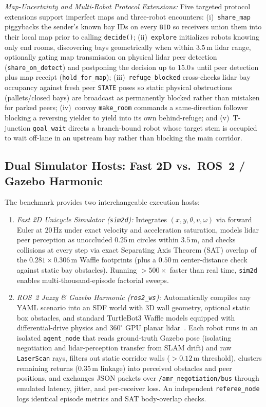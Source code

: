 \documentclass[letterpaper,journal]{IEEEtran}
\begin{document}
\smallskip\noindent\emph{Map-Uncertainty and Multi-Robot Protocol Extensions:} Five targeted protocol extensions support imperfect maps and three-robot encounters: (i)~\texttt{share\_map} piggybacks the sender's known bay IDs on every \texttt{BID} so receivers union them into their local map prior to calling \texttt{decide()}; (ii)~\texttt{explore} initializes robots knowing only end rooms, discovering bays geometrically when within $3.5$\,m lidar range, optionally gating map transmission on physical lidar peer detection (\texttt{share\_on\_detect}) and postponing the decision up to $15.0$\,s until peer detection plus map receipt (\texttt{hold\_for\_map}); (iii)~\texttt{refuge\_blocked} cross-checks lidar bay occupancy against fresh peer \texttt{STATE} poses so static physical obstructions (pallets/closed bays) are broadcast as permanently blocked rather than mistaken for parked peers; (iv)~convoy \texttt{make\_room} commands a same-direction follower blocking a reversing yielder to yield into its own behind-refuge; and (v)~T-junction \texttt{goal\_wait} directs a branch-bound robot whose target stem is occupied to wait off-lane in an upstream bay rather than blocking the main corridor.

\subsection{Dual Simulator Hosts: Fast 2D vs.\ ROS~2 / Gazebo Harmonic}
The benchmark provides two interchangeable execution hosts:
\begin{enumerate}
\item \emph{Fast 2D Unicycle Simulator (\texttt{sim2d}):} Integrates $(x,y,\theta,v,\omega)$ via forward Euler at $20$\,Hz under exact velocity and acceleration saturation, models lidar peer perception as unoccluded $0.25$\,m circles within $3.5$\,m, and checks collisions at every step via exact Separating Axis Theorem (SAT) overlap of the $0.281\times 0.306$\,m Waffle footprints (plus a $0.50$\,m center-distance check against static bay obstacles). Running $>500\times$ faster than real time, \texttt{sim2d} enables multi-thousand-episode factorial sweeps.
\item \emph{ROS~2 Jazzy \& Gazebo Harmonic (\texttt{ros2\_ws}):} Automatically compiles any YAML scenario into an SDF world with 3D wall geometry, optional static box obstacles, and standard TurtleBot3 Waffle models equipped with differential-drive physics and $360^\circ$ GPU planar lidar~\cite{gazebosim}. Each robot runs in an isolated \texttt{agent\_node} that reads ground-truth Gazebo pose (isolating negotiation and lidar-perception transfer from SLAM drift) and raw \texttt{LaserScan} rays, filters out static corridor walls ($>0.12$\,m threshold), clusters remaining returns ($0.35$\,m linkage) into perceived obstacles and peer positions, and exchanges JSON packets over \texttt{/amr\_negotiation/bus} through emulated latency, jitter, and per-receiver loss. An independent \texttt{referee\_node} logs identical episode metrics and SAT body-overlap checks.
\end{enumerate}
\end{document}
